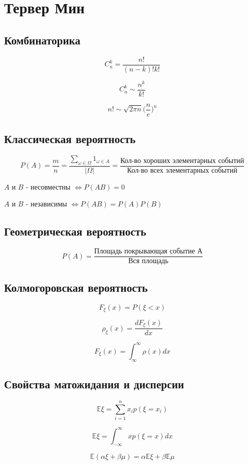 \documentclass[a4paper, 14pt]{extarticle}
\begin{document}
\section{Тервер Мин}
\subsection{Комбинаторика}

$$C_n^k = \frac{n!}{(n-k)!k!}$$

$$C_n^k \sim \frac{n^k}{k!}$$

$$n! \sim \sqrt{2\pi n}\Big(\frac{n}{e}\Big)^n$$

\subsection{Классическая вероятность}

$$P(A) = \frac{m}{n} = \frac{\sum_{\omega \in \Omega}1_{\omega \in A}}{|\Omega|} = \frac{\textrm{Кол-во хороших элементарных событий}}{\textrm{Кол-во всех элементарных событий}}$$

$A$ и $B$ - несовместны $\Leftrightarrow P(AB) = 0$

$A$ и $B$ - независимы $\Leftrightarrow P(AB) = P(A)P(B)$


\subsection{Геометрическая вероятность}

$$P(A) = \frac{\textrm{Площадь покрывающая событие А}}{\textrm{Вся площадь}}$$

\subsection{Колмогоровская вероятность}

$$F_{\xi}(x) = P(\xi < x)$$

$$\rho_{\xi}(x) = \frac{dF_\xi(x)}{dx}$$

$$F_{\xi}(x) = \int_{\infty}^{\infty}\rho(x)dx$$

\subsection{Свойства матожидания и дисперсии}

$$\mathbb{E}\xi = \sum_{i=1}^{n} x_i p(\xi=x_i)$$

$$\mathbb{E}\xi = \int_{-\infty}^{\infty} x p(\xi=x)dx$$

$$\mathbb{E}(\alpha \xi + \beta \mu) = \alpha \mathbb{E}\xi + \beta \mathbb{E}\mu$$
\end{document}

